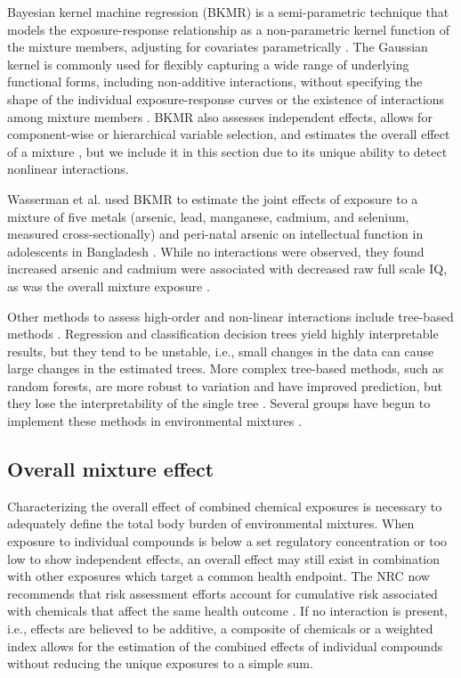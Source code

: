 Bayesian kernel machine regression (BKMR) is a semi-parametric technique that models the exposure-response relationship as a non-parametric kernel function of the mixture members, adjusting for covariates parametrically \citep{bobb2014bayesian, coull2015,bobb2018statistical}. The Gaussian kernel is commonly used for flexibly capturing a wide range of underlying functional forms, including non-additive interactions, without specifying the shape of the individual exposure-response curves or the existence of interactions among mixture members \citep{bobb2014bayesian, liu2007semiparametric}. BKMR also assesses independent effects, allows for component-wise or hierarchical variable selection, and estimates the overall effect of a mixture \citep{bobb2014bayesian, coull2015, bobb2018statistical}, but we include it in this section due to its unique ability to detect nonlinear interactions.

Wasserman et al. used BKMR to estimate the joint effects of exposure to a mixture of five metals (arsenic, lead, manganese, cadmium, and selenium, measured cross-sectionally) and peri-natal arsenic on intellectual function in adolescents in Bangladesh \citep{wasserman2018cross}. While no interactions were observed, they found increased arsenic and cadmium were associated with decreased raw full scale IQ, as was the overall mixture exposure \citep{wasserman2018cross}.

Other methods to assess high-order and non-linear interactions include tree-based methods \citep{friedman2001elements}. Regression and classification decision trees yield highly interpretable results, but they tend to be unstable, i.e., small changes in the data can cause large changes in the estimated trees. More complex tree-based methods, such as random forests, are more robust to variation and have improved prediction, but they lose the interpretability of the single tree \citep{ISLR}. Several groups have begun to implement these methods in environmental mixtures \citep{stingone2017using, ouidir2017atmospheric, gass2014classification}.

\subsection{Overall mixture effect}\label{sec:Overall}

Characterizing the overall effect of combined chemical exposures is necessary to adequately define the total body burden of environmental mixtures. When exposure to individual compounds is below a set regulatory concentration or too low to show independent effects, an overall effect may still exist in combination with other exposures which target a common health endpoint. The NRC now recommends that risk assessment efforts account for cumulative risk associated with chemicals that affect the same health outcome \citep{national2009phthalates, huang2018cumulative}. If no interaction is present, i.e., effects are believed to be additive, a composite of chemicals or a weighted index allows for the estimation of the combined effects of individual compounds without reducing the unique exposures to a simple sum. 

